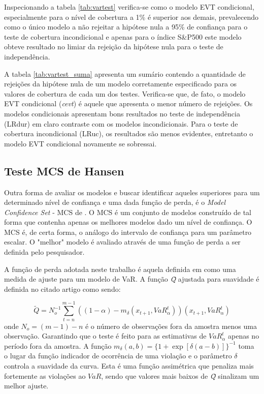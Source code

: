 \documentclass[1p]{elsarticle}
\theoremstyle{definition}
\begin{document}


Inspecionando a tabela \ref{tab:vartest} verifica-se como o modelo EVT condicional, especialmente para o nível de cobertura a 1\% é superior aos demais, prevalecendo como o único modelo a não rejeitar a hipótese nula a 95\% de confiança para o teste de cobertura incondicional e apenas para o índice S\&P500 este modelo obteve resultado no limiar da rejeição da hipótese nula para o teste de independência.

A tabela \ref{tab:vartest_suma} apresenta um sumário contendo a quantidade de rejeições da hipótese nula de um modelo corretamente especificado para os valores de cobertura de cada um dos testes. Verifica-se que, de fato, o modelo EVT condicional (\emph{cevt}) é aquele que apresenta o menor número de rejeições. Os modelos condicionais apresentam bons resultados no teste de independência (LRdur) em claro contraste com os modelos incondicionais. Para o teste de cobertura incondicional (LRuc), os resultados são menos evidentes, entretanto o modelo EVT condicional novamente se sobressai.



\subsection{Teste MCS de Hansen}
\label{sec:mcs}

Outra forma de avaliar os modelos e buscar identificar aqueles superiores para um determinado nível de confiança e uma dada função de perda, é o \emph{Model Confidence Set} - MCS de \cite{Hansen2011}. O MCS é um conjunto de modelos construído de tal forma que contenha apenas os melhores modelos dado um nível de confiança. O MCS é, de certa forma, o análogo do intervalo de confiança para um parâmetro escalar. O "melhor" modelo é avaliado através de uma função de perda a ser definida pelo pesquisador.

A função de perda adotada neste trabalho é aquela definida em \cite{Gonzalez-Rivera2004} como uma medida de ajuste para um modelo de VaR. A função \emph{\~{Q}} ajustada para suavidade é definida no citado artigo como sendo:

\begin{equation}
	\tilde{Q} = N_o^{-1}\sum_{t=n}^{m-1}((1-\alpha)-m_\delta(x_{t+1}, VaR^t_\alpha))(x_{t+1}, VaR^t_\alpha)
\end{equation}
onde $N_o = (m-1)-n$ é o número de observações fora da amostra menos uma observação. Garantindo que o teste é feito para as estimativas de $VaR^t_\alpha$ apenas no período fora da amostra. A função $m_\delta(a, b)=\{1+\exp[\delta(a-b)]\}^{-1}$ toma o lugar da função indicador de ocorrência de uma violação e o parâmetro $\delta$ controla a suavidade da curva. Esta é uma função assimétrica que penaliza mais fortemente as violações ao $VaR$, sendo que valores mais baixos de \emph{\~{Q}} sinalizam um melhor ajuste.
\end{document}
